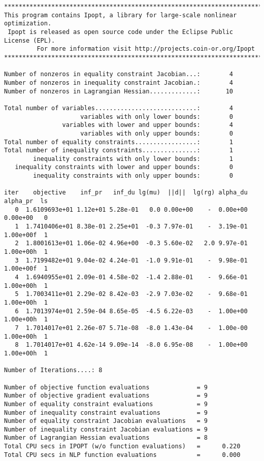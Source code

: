 \documentclass[10pt]{article}
\begin{document}
\begin{footnotesize}
\begin{verbatim}
******************************************************************************
This program contains Ipopt, a library for large-scale nonlinear optimization.
 Ipopt is released as open source code under the Eclipse Public License (EPL).
         For more information visit http://projects.coin-or.org/Ipopt
******************************************************************************

Number of nonzeros in equality constraint Jacobian...:        4
Number of nonzeros in inequality constraint Jacobian.:        4
Number of nonzeros in Lagrangian Hessian.............:       10

Total number of variables............................:        4
                     variables with only lower bounds:        0
                variables with lower and upper bounds:        4
                     variables with only upper bounds:        0
Total number of equality constraints.................:        1
Total number of inequality constraints...............:        1
        inequality constraints with only lower bounds:        1
   inequality constraints with lower and upper bounds:        0
        inequality constraints with only upper bounds:        0

iter    objective    inf_pr   inf_du lg(mu)  ||d||  lg(rg) alpha_du alpha_pr  ls
   0  1.6109693e+01 1.12e+01 5.28e-01   0.0 0.00e+00    -  0.00e+00 0.00e+00   0
   1  1.7410406e+01 8.38e-01 2.25e+01  -0.3 7.97e-01    -  3.19e-01 1.00e+00f  1
   2  1.8001613e+01 1.06e-02 4.96e+00  -0.3 5.60e-02   2.0 9.97e-01 1.00e+00h  1
   3  1.7199482e+01 9.04e-02 4.24e-01  -1.0 9.91e-01    -  9.98e-01 1.00e+00f  1
   4  1.6940955e+01 2.09e-01 4.58e-02  -1.4 2.88e-01    -  9.66e-01 1.00e+00h  1
   5  1.7003411e+01 2.29e-02 8.42e-03  -2.9 7.03e-02    -  9.68e-01 1.00e+00h  1
   6  1.7013974e+01 2.59e-04 8.65e-05  -4.5 6.22e-03    -  1.00e+00 1.00e+00h  1
   7  1.7014017e+01 2.26e-07 5.71e-08  -8.0 1.43e-04    -  1.00e-00 1.00e+00h  1
   8  1.7014017e+01 4.62e-14 9.09e-14  -8.0 6.95e-08    -  1.00e+00 1.00e+00h  1

Number of Iterations....: 8

Number of objective function evaluations             = 9
Number of objective gradient evaluations             = 9
Number of equality constraint evaluations            = 9
Number of inequality constraint evaluations          = 9
Number of equality constraint Jacobian evaluations   = 9
Number of inequality constraint Jacobian evaluations = 9
Number of Lagrangian Hessian evaluations             = 8
Total CPU secs in IPOPT (w/o function evaluations)   =      0.220
Total CPU secs in NLP function evaluations           =      0.000


\end{verbatim}
\end{footnotesize}
\end{document}
